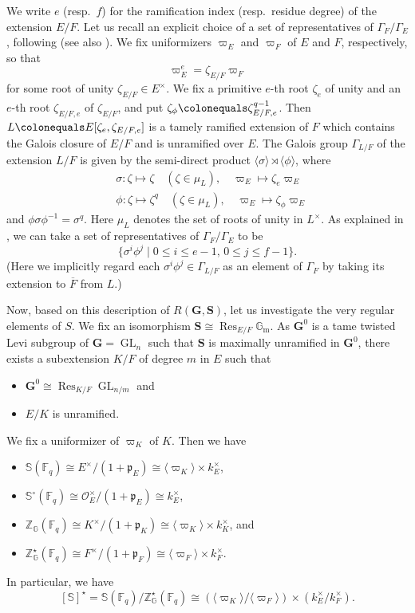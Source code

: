 \documentclass{amsart}
\newcommand{\mcO}{\mathcal{O}}
\newcommand{\mfp}{\mathfrak{p}}
\newcommand{\F}{\mathbb{F}}
\newcommand{\Gm}{\mathbb{G}_{\mathrm{m}}}
\newcommand{\bbS}{\mathbb{S}}
\newcommand{\bbG}{\mathbb{G}}
\newcommand{\bfG}{\mathbf{G}}
\newcommand{\bbZ}{\mathbb{Z}}
\newcommand{\bfS}{\mathbf{S}}
\DeclareMathOperator{\Res}{Res}
\DeclareMathOperator{\GL}{GL}
\theoremstyle{plain}
\theoremstyle{definition}
\theoremstyle{remark}
\theoremstyle{theorem}
\begin{document}
We write $e$ (resp.\ $f$) for the ramification index (resp.\ residue degree) of the extension $E/F$.
Let us recall an explicit choice of a set of representatives of 
$\Gamma_F/\Gamma_E$, following \cite[Section 3.2]{OT21} (see also \cite[Section 5.1]{Tam16}).
We fix uniformizers $\varpi_{E}$ and $\varpi_{F}$ of $E$ and $F$, respectively, so that
\[
\varpi_{E}^e=\zeta _{E/F}\varpi_{F}
\]
for some root of unity $\zeta_{E/F} \in E^{\times}$.
We fix a primitive $e$-th root $\zeta_{e}$ of unity 
and an $e$-th root $\zeta_{E/F, e}$ of $\zeta_{E/F}$,
and put $\zeta_{\phi}\colonequals \zeta_{E/F, e}^{q-1}$.
Then $L\colonequals E[\zeta_{e}, \zeta_{E/F, e}]$ is a tamely ramified extension of $F$
which contains the Galois closure of $E/F$ and is unramified over $E$.
The Galois group $\Gamma_{L/F}$ of the extension $L/F$ is given by the semi-direct product
$\langle \sigma \rangle \rtimes \langle \phi \rangle$, where
\begin{align*}
&\sigma \colon \zeta \mapsto \zeta \quad (\zeta \in \mu_{L}), \quad \varpi_{E} \mapsto \zeta_e \varpi_{E} \\
&\phi \colon \zeta \mapsto \zeta ^q \quad (\zeta \in \mu_{L}), \quad \varpi_{E} \mapsto \zeta_{\phi}\varpi_{E}
\end{align*}
and $\phi \sigma \phi ^{-1}=\sigma ^q$.
Here $\mu_{L}$ denotes the set of roots of unity in $L^{\times}$.
As explained in \cite[Proposition 3.3 (i)]{OT21}, we can take a set of representatives of $\Gamma_{F}/\Gamma_{E}$ to be
\[
\{
\sigma^{i}\phi^{j}
\mid
0\leq i \leq e-1,\, 0\leq j \leq f-1
\}.
\]
(Here we implicitly regard each $\sigma^{i}\phi^{j}\in\Gamma_{L/F}$ as an element of $\Gamma_{F}$ by taking its extension to $\overline{F}$ from $L$.)

Now, based on this description of $R(\bfG,\bfS)$, let us investigate the very regular elements of $S$.
We fix an isomorphism $\bfS\cong\Res_{E/F}\Gm$.
As $\bfG^{0}$ is a tame twisted Levi subgroup of $\bfG=\GL_{n}$ such that $\bfS$ is maximally unramified in $\bfG^{0}$, there exists a subextension $K/F$ of degree $m$ in $E$ such that
\begin{itemize}
\item
$\bfG^{0}\cong\Res_{K/F}\GL_{n/m}$ and
\item
$E/K$ is unramified.
\end{itemize}
We fix a uniformizer of $\varpi_{K}$ of $K$.
Then we have
\begin{itemize}
\item
$\bbS(\F_{q})\cong E^{\times}/(1+\mfp_{E})\cong\langle\varpi_{K}\rangle\times k_{E}^{\times}$,
\item
$\bbS^{\circ}(\F_{q})\cong \mcO_{E}^{\times}/(1+\mfp_{E})\cong k_{E}^{\times}$, 
\item
$\bbZ_{\bbG}(\F_{q})\cong K^{\times}/(1+\mfp_{K})\cong\langle\varpi_{K}\rangle\times k_{K}^{\times}$, and 
\item
$\bbZ^{\star}_{\bbG}(\F_{q})\cong F^{\times}/(1+\mfp_{F})\cong\langle\varpi_{F}\rangle\times k_{F}^{\times}$.
\end{itemize}
In particular, we have
\[
[\bbS]^{\star}
=\bbS(\F_{q})/\bbZ^{\star}_{\bbG}(\F_{q})
\cong (\langle\varpi_{K}\rangle/\langle\varpi_{F}\rangle)\times(k_{E}^{\times}/k_{F}^{\times}).
\]
\end{document}
